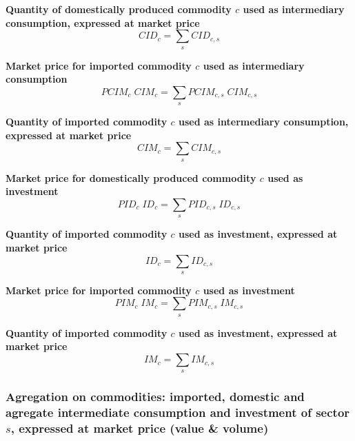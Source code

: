 \documentclass[12pt]{article}
\numberwithin{equation}{section}
\begin{document}
\noindent\textbf{Quantity of domestically produced commodity $c$ used as intermediary consumption, expressed at market price} \\
\begin{dmath}
CID_{c} = \sum_{s} CID_{c, s}
\end{dmath}

\noindent\textbf{Market price for imported commodity $c$ used as intermediary consumption} \\
\begin{dmath}
PCIM_{c} \; CIM_{c} = \sum_{s} PCIM_{c, s} \; CIM_{c, s}
\end{dmath}

\noindent\textbf{Quantity of imported commodity $c$ used as intermediary consumption, expressed at market price} \\
\begin{dmath}
CIM_{c} = \sum_{s} CIM_{c, s}
\end{dmath}

\noindent\textbf{Market price for domestically produced commodity $c$ used as investment} \\
\begin{dmath}
PID_{c} \; ID_{c} = \sum_{s} PID_{c, s} \; ID_{c, s}
\end{dmath}

\noindent\textbf{Quantity of imported commodity $c$ used as investment, expressed at market price} \\
\begin{dmath}
ID_{c} = \sum_{s} ID_{c, s}
\end{dmath}

\noindent\textbf{Market price for imported commodity $c$ used as investment} \\
\begin{dmath}
PIM_{c} \; IM_{c} = \sum_{s} PIM_{c, s} \; IM_{c, s}
\end{dmath}

\noindent\textbf{Quantity of imported commodity $c$ used as investment, expressed at market price} \\
\begin{dmath}
IM_{c} = \sum_{s} IM_{c, s}
\end{dmath}




\subsubsection{Agregation on commodities: imported, domestic and agregate intermediate consumption and investment of sector $s$, expressed at market price (value \& volume)}
\end{document}
